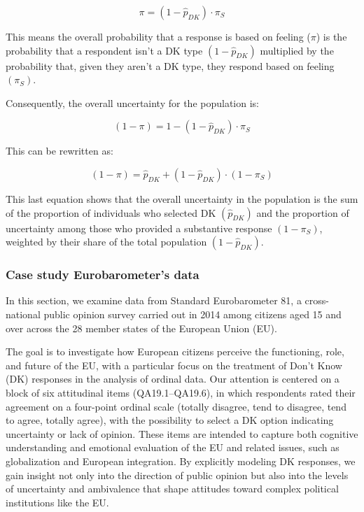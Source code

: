 \documentclass[
  letterpaper,
  DIV=11,
  numbers=noendperiod]{scrartcl}
\begin{document}
\[
\pi = (1-\hat{p}_{DK})\cdot\pi_S
\]

This means the overall probability that a response is based on feeling
(\(\pi\)) is the probability that a respondent isn't a DK type
\((1-\hat{p}_{DK})\) multiplied by the probability that, given they
aren't a DK type, they respond based on feeling \((\pi_S)\).

Consequently, the overall uncertainty for the population is:

\[
(1-\pi) = 1-(1-\hat{p}_{DK})\cdot\pi_S
\]

This can be rewritten as:

\[
(1-\pi) = \hat{p}_{DK} + (1-\hat{p}_{DK})\cdot(1-\pi_S)
\]

This last equation shows that the overall uncertainty in the population
is the sum of the proportion of individuals who selected DK
\((\hat{p}_{DK})\) and the proportion of uncertainty among those who
provided a substantive response \((1-\pi_S)\), weighted by their share
of the total population \((1-\hat{p}_{DK})\).

\hypertarget{case-study-eurobarometers-data}{%
\subsubsection{Case study Eurobarometer's
data}\label{case-study-eurobarometers-data}}

In this section, we examine data from Standard Eurobarometer 81, a
cross-national public opinion survey carried out in 2014 among citizens
aged 15 and over across the 28 member states of the European Union (EU).

The goal is to investigate how European citizens perceive the
functioning, role, and future of the EU, with a particular focus on the
treatment of Don't Know (DK) responses in the analysis of ordinal data.
Our attention is centered on a block of six attitudinal items
(QA19.1--QA19.6), in which respondents rated their agreement on a
four-point ordinal scale (totally disagree, tend to disagree, tend to
agree, totally agree), with the possibility to select a DK option
indicating uncertainty or lack of opinion. These items are intended to
capture both cognitive understanding and emotional evaluation of the EU
and related issues, such as globalization and European integration. By
explicitly modeling DK responses, we gain insight not only into the
direction of public opinion but also into the levels of uncertainty and
ambivalence that shape attitudes toward complex political institutions
like the EU.
\end{document}
